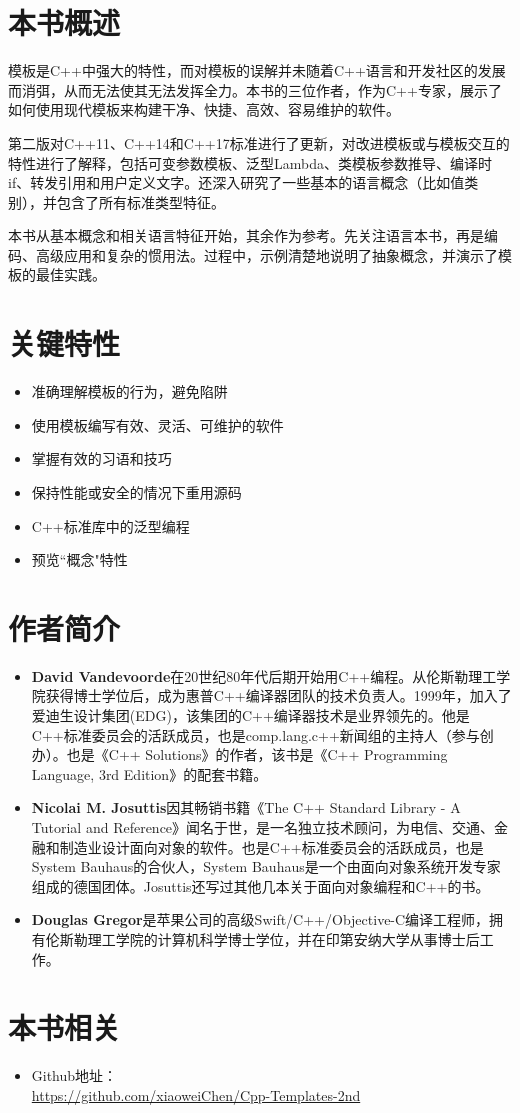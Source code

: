 \section*{本书概述}

模板是C++中强大的特性，而对模板的误解并未随着C++语言和开发社区的发展而消弭，从而无法使其无法发挥全力。本书的三位作者，作为C++专家，展示了如何使用现代模板来构建干净、快捷、高效、容易维护的软件。

第二版对C++11、C++14和C++17标准进行了更新，对改进模板或与模板交互的特性进行了解释，包括可变参数模板、泛型Lambda、类模板参数推导、编译时if、转发引用和用户定义文字。还深入研究了一些基本的语言概念（比如值类别），并包含了所有标准类型特征。

本书从基本概念和相关语言特征开始，其余作为参考。先关注语言本书，再是编码、高级应用和复杂的惯用法。过程中，示例清楚地说明了抽象概念，并演示了模板的最佳实践。

\section*{关键特性}
\begin{itemize}
  \item 准确理解模板的行为，避免陷阱
  \item 使用模板编写有效、灵活、可维护的软件
  \item 掌握有效的习语和技巧
  \item 保持性能或安全的情况下重用源码
  \item C++标准库中的泛型编程
  \item 预览“概念"特性
\end{itemize}

\section*{作者简介}

\begin{itemize}
  \item \textbf{David Vandevoorde}在20世纪80年代后期开始用C++编程。从伦斯勒理工学院获得博士学位后，成为惠普C++编译器团队的技术负责人。1999年，加入了爱迪生设计集团(EDG)，该集团的C++编译器技术是业界领先的。他是C++标准委员会的活跃成员，也是comp.lang.c++新闻组的主持人（参与创办）。也是《C++ Solutions》的作者，该书是《C++ Programming Language, 3rd Edition》的配套书籍。

  \item \textbf{Nicolai M. Josuttis}因其畅销书籍《The C++ Standard Library - A Tutorial and Reference》闻名于世，是一名独立技术顾问，为电信、交通、金融和制造业设计面向对象的软件。也是C++标准委员会的活跃成员，也是System Bauhaus的合伙人，System Bauhaus是一个由面向对象系统开发专家组成的德国团体。Josuttis还写过其他几本关于面向对象编程和C++的书。

  \item \textbf{Douglas Gregor}是苹果公司的高级Swift/C++/Objective-C编译工程师，拥有伦斯勒理工学院的计算机科学博士学位，并在印第安纳大学从事博士后工作。
\end{itemize}


\section*{本书相关}
\begin{itemize}
  \item Github地址：\\\url{https://github.com/xiaoweiChen/Cpp-Templates-2nd}
\end{itemize}